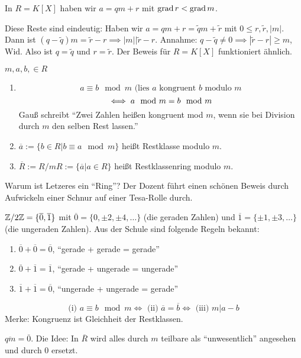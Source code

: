 \documentclass[a4paper,twoside,DIV15,BCOR12mm]{scrbook}
\begin{document}
In $R=K[X]$ haben wir $a=qm+r$ mit $\mathop{\mathrm{grad}}\nolimits r < \mathop{\mathrm{grad}}\nolimits m$.

Diese Reste sind eindeutig: Haben wir $a=qm+r=\tilde q m + \tilde r$
mit $0\le r,\tilde r, |m|$. Dann ist $(q-\tilde q)m=\tilde r -r
\implies |m|\big|\tilde r - r$. Annahme: $q-\tilde q \ne 0 \implies
|\tilde r - r| \ge m$, Wid. Also ist $q=\tilde q$ und $r = \tilde
r$. Der Beweis für $R=K[X]$ funktioniert ähnlich.

\begin{definition}[Gauß für $R=\MdZ$]
$m,a,b, \in R$
\begin{enumerate}
\item \[ a \equiv b \mod m \text{ (lies $a$ kongruent $b$ modulo $m$} \]
\[ \iff a \mod m = b\mod m \]
Gauß schreibt "`Zwei Zahlen heißen kongruent mod $m$, wenn sie bei
Division durch $m$ den selben Rest lassen."'
\item $\overline a := \{ b \in R| b \equiv a \mod m \}$ heißt Restklasse modulo $m$.
\item $\overline R := R/mR := \{\overline a | a \in R\}$ heißt Restklassenring modulo $m$.
\end{enumerate}
\end{definition}

Warum ist Letzeres ein "`Ring"'? Der Dozent führt einen schönen
Beweis durch Aufwickeln einer Schnur auf einer Tesa-Rolle durch.

\begin{beispiel}
$\mathbb{Z}/2\mathbb{Z} = \{ \overline 0, \overline 1\}$ mit $\overline 0 = \{0,
\pm 2, \pm 4, \ldots \}$ (die geraden Zahlen) und $\overline 1 =
\{\pm 1, \pm 3, \ldots \}$ (die ungeraden Zahlen). Aus der Schule
sind folgende Regeln bekannt:
\begin{enumerate}
\item $\overline 0 + \overline 0 = \overline 0$, "`gerade + gerade = gerade"'
\item $\overline 0 + \overline 1 = \overline 1$, "`gerade + ungerade = ungerade"'
\item $\overline 1 + \overline 1 = \overline 0$, "`ungerade + ungerade = gerade"'
\end{enumerate}
\end{beispiel}

\begin{bemerkung}
\[ \text{(i) } a\equiv b \mod m \iff \text{ (ii) } \overline a =  \overline b \iff \text{ (iii) }m|a-b\]
Merke: Kongruenz ist Gleichheit der Restklassen.

$\overline{qm} = \overline 0$. Die Idee: In $\overline R$ wird alles
durch $m$ teilbare als "`unwesentlich"' angesehen  und durch $0$
ersetzt.
\end{bemerkung}
\end{document}
